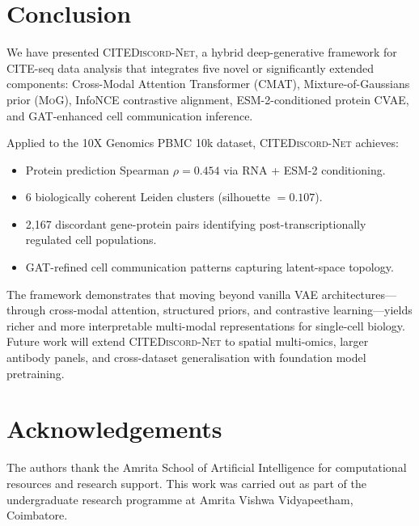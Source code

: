 \documentclass[11pt,a4paper]{article}
\newcommand{\cmat}{\textsc{CMAT}}
\newcommand{\mog}{\textsc{MoG}}
\newcommand{\citenet}{\textsc{CITEDiscord-Net}}
\begin{document}
\section{Conclusion}\label{sec:conclusion}

We have presented \citenet{}, a hybrid deep-generative framework for CITE-seq data analysis that integrates five novel or significantly extended components: Cross-Modal Attention Transformer (\cmat), Mixture-of-Gaussians prior (\mog), InfoNCE contrastive alignment, ESM-2-conditioned protein CVAE, and GAT-enhanced cell communication inference.

Applied to the 10X Genomics PBMC 10k dataset, \citenet{} achieves:
\begin{itemize}[leftmargin=*]
  \item Protein prediction Spearman $\rho = 0.454$ via RNA + ESM-2 conditioning.
  \item 6 biologically coherent Leiden clusters (silhouette $=0.107$).
  \item 2,167 discordant gene-protein pairs identifying post-transcriptionally regulated cell populations.
  \item GAT-refined cell communication patterns capturing latent-space topology.
\end{itemize}

The framework demonstrates that moving beyond vanilla VAE architectures---through cross-modal attention, structured priors, and contrastive learning---yields richer and more interpretable multi-modal representations for single-cell biology.
Future work will extend \citenet{} to spatial multi-omics, larger antibody panels, and cross-dataset generalisation with foundation model pretraining.

\section*{Acknowledgements}

The authors thank the Amrita School of Artificial Intelligence for computational resources and research support.
This work was carried out as part of the undergraduate research programme at Amrita Vishwa Vidyapeetham, Coimbatore.
\end{document}
